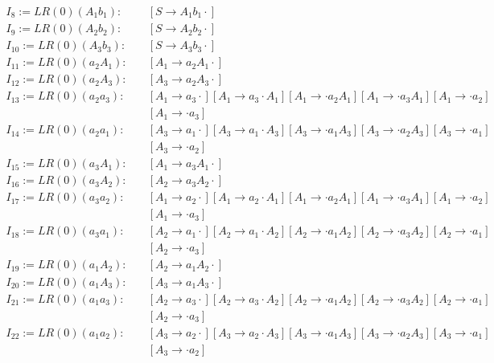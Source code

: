 \begin{equation*}
\begin{split}
	I_8 := LR(0)(A_1b_1):\quad &[S \rightarrow A_1b_1 \cdot]\\
	I_9 := LR(0)(A_2b_2):\quad &[S \rightarrow A_2b_2 \cdot]\\
	I_{10} := LR(0)(A_3b_3):\quad &[S \rightarrow A_3b_3 \cdot]\\
	I_{11} := LR(0)(a_2A_1):\quad &[A_1 \rightarrow a_2A_1 \cdot]\\
	I_{12} := LR(0)(a_2A_3):\quad &[A_3 \rightarrow a_2A_3 \cdot]\\
	I_{13} := LR(0)(a_2a_3):\quad &[A_1 \rightarrow a_3 \cdot][A_1 \rightarrow a_3 \cdot A_1][A_1 \rightarrow \cdot a_2A_1][A_1 \rightarrow \cdot a_3A_1][A_1 \rightarrow \cdot a_2]\\
	&[A_1 \rightarrow \cdot a_3]\\
	I_{14} := LR(0)(a_2a_1):\quad &[A_3 \rightarrow a_1 \cdot][A_3 \rightarrow a_1 \cdot A_3][A_3 \rightarrow \cdot a_1A_3][A_3 \rightarrow \cdot a_2A_3][A_3 \rightarrow \cdot a_1]\\
	&[A_3 \rightarrow \cdot a_2]\\
	I_{15} := LR(0)(a_3A_1):\quad &[A_1 \rightarrow a_3A_1 \cdot]\\
	I_{16} := LR(0)(a_3A_2):\quad &[A_2 \rightarrow a_3A_2 \cdot]\\
	I_{17} := LR(0)(a_3a_2):\quad &[A_1 \rightarrow a_2 \cdot][A_1 \rightarrow a_2 \cdot A_1][A_1 \rightarrow \cdot a_2A_1][A_1 \rightarrow \cdot a_3A_1][A_1 \rightarrow \cdot a_2]\\
	&[A_1 \rightarrow \cdot a_3]\\
	I_{18} := LR(0)(a_3a_1):\quad &[A_2 \rightarrow a_1 \cdot][A_2 \rightarrow a_1 \cdot A_2][A_2 \rightarrow \cdot a_1A_2][A_2 \rightarrow \cdot a_3A_2][A_2 \rightarrow \cdot a_1]\\
	&[A_2 \rightarrow \cdot a_3]
\end{split}
\end{equation*}
\begin{equation*}
\begin{split}
	I_{19} := LR(0)(a_1A_2):\quad &[A_2 \rightarrow a_1A_2 \cdot]\\
	I_{20} := LR(0)(a_1A_3):\quad &[A_3 \rightarrow a_1A_3 \cdot]\\
	I_{21} := LR(0)(a_1a_3):\quad &[A_2 \rightarrow a_3 \cdot][A_2 \rightarrow a_3 \cdot A_2][A_2 \rightarrow \cdot a_1A_2][A_2 \rightarrow \cdot a_3A_2][A_2 \rightarrow \cdot a_1]\\
	&[A_2 \rightarrow \cdot a_3]\\
	I_{22} := LR(0)(a_1a_2):\quad &[A_3 \rightarrow a_2 \cdot][A_3 \rightarrow a_2 \cdot A_3][A_3 \rightarrow \cdot a_1A_3][A_3 \rightarrow \cdot a_2A_3][A_3 \rightarrow \cdot a_1]\\
	&[A_3 \rightarrow \cdot a_2]\\
\end{split}
\end{equation*}
